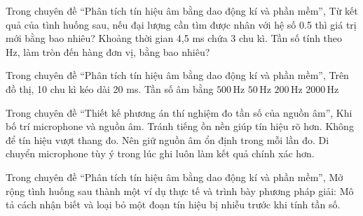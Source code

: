 \begin{ex}
Trong chuyên đề “Phân tích tín hiệu âm bằng dao động kí và phần mềm”, Từ kết quả của tình huống sau, nếu đại lượng cần tìm được nhân với hệ số 0.5 thì giá trị mới bằng bao nhiêu? Khoảng thời gian 4,5 ms chứa 3 chu kì. Tần số tính theo Hz, làm tròn đến hàng đơn vị, bằng bao nhiêu?
\end{ex}

\begin{ex}
Trong chuyên đề “Phân tích tín hiệu âm bằng dao động kí và phần mềm”, Trên đồ thị, 10 chu kì kéo dài 20 ms. Tần số âm bằng
\choice
{\True $500\,\text{Hz}$}
{$50\,\text{Hz}$}
{$200\,\text{Hz}$}
{$2000\,\text{Hz}$}
\end{ex}

\begin{ex}
Trong chuyên đề “Thiết kế phương án thí nghiệm đo tần số của nguồn âm”, Khi bố trí microphone và nguồn âm.
\choiceTF
{\True Tránh tiếng ồn nền giúp tín hiệu rõ hơn.}
{\True Không để tín hiệu vượt thang đo.}
{\True Nên giữ nguồn âm ổn định trong mỗi lần đo.}
{Di chuyển microphone tùy ý trong lúc ghi luôn làm kết quả chính xác hơn.}
\end{ex}

\begin{ex}
Trong chuyên đề “Phân tích tín hiệu âm bằng dao động kí và phần mềm”, Mở rộng tình huống sau thành một ví dụ thực tế và trình bày phương pháp giải: Mô tả cách nhận biết và loại bỏ một đoạn tín hiệu bị nhiễu trước khi tính tần số.
\choiceTF

\end{ex}

